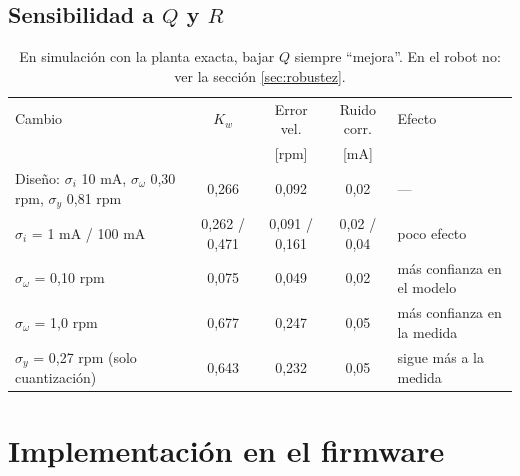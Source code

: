 \documentclass[11pt]{article}
\begin{document}
\subsection*{Sensibilidad a $Q$ y $R$}
\begin{table}[H]\centering\small
\begin{tabular}{>{\raggedright\arraybackslash}p{4.3cm}ccc>{\raggedright\arraybackslash}p{3.6cm}}
\toprule
Cambio & $K_w$ & Error vel. & Ruido corr. & Efecto \\
 & & [rpm] & [mA] & \\
\midrule
Diseño: $\sigma_i$ 10 mA, $\sigma_\omega$ 0,30 rpm, $\sigma_y$ 0,81 rpm & 0,266 & 0,092 & 0,02 & — \\
$\sigma_i$ = 1 mA / 100 mA & 0,262 / 0,471 & 0,091 / 0,161 & 0,02 / 0,04 & poco efecto \\
$\sigma_\omega$ = 0,10 rpm & 0,075 & 0,049 & 0,02 & más confianza en el modelo \\
$\sigma_\omega$ = 1,0 rpm & 0,677 & 0,247 & 0,05 & más confianza en la medida \\
$\sigma_y$ = 0,27 rpm (solo cuantización) & 0,643 & 0,232 & 0,05 & sigue más a la medida \\
\bottomrule
\end{tabular}
\caption{En simulación con la planta exacta, bajar $Q$ siempre ``mejora''. En el robot no: ver la sección \ref{sec:robustez}.}
\end{table}

\section{Implementación en el firmware}
\end{document}

